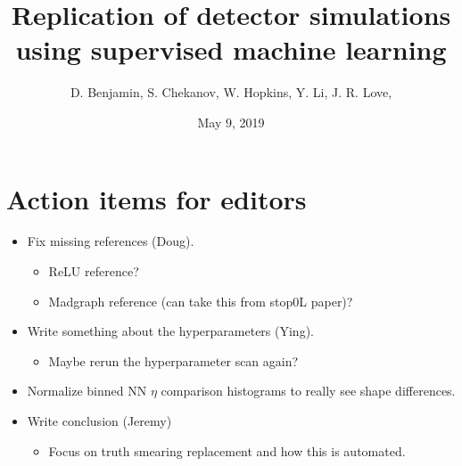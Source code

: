 \documentclass[showpacs,showkeys,preprint,prd,nofootinbib,linenumbers,12pt]{revtex4-1}
\begin{document}


\date{May 9, 2019}

\vspace{2.5cm}

\title{
  Replication of detector simulations using supervised machine learning 
}


\author{D. Benjamin, S. Chekanov, W. Hopkins, Y. Li, J. R. Love,}
% 



\begin{abstract}

\end{abstract}


\maketitle

\section{Action items for editors}
\begin{itemize}
\item Fix missing references (Doug).
  \begin{itemize}
  \item ReLU reference?
  \item Madgraph reference (can take this from stop0L paper)?
  \end{itemize}
\item Write something about the hyperparameters (Ying).
  \begin{itemize}
  \item Maybe rerun the hyperparameter scan again?
  \end{itemize}
\item Normalize binned NN $\eta$ comparison histograms to really see shape differences. 
\item Write conclusion (Jeremy)
  \begin{itemize}
  \item Focus on truth smearing replacement and how this is automated.
  \end{itemize}

\end{itemize}
\end{document}

